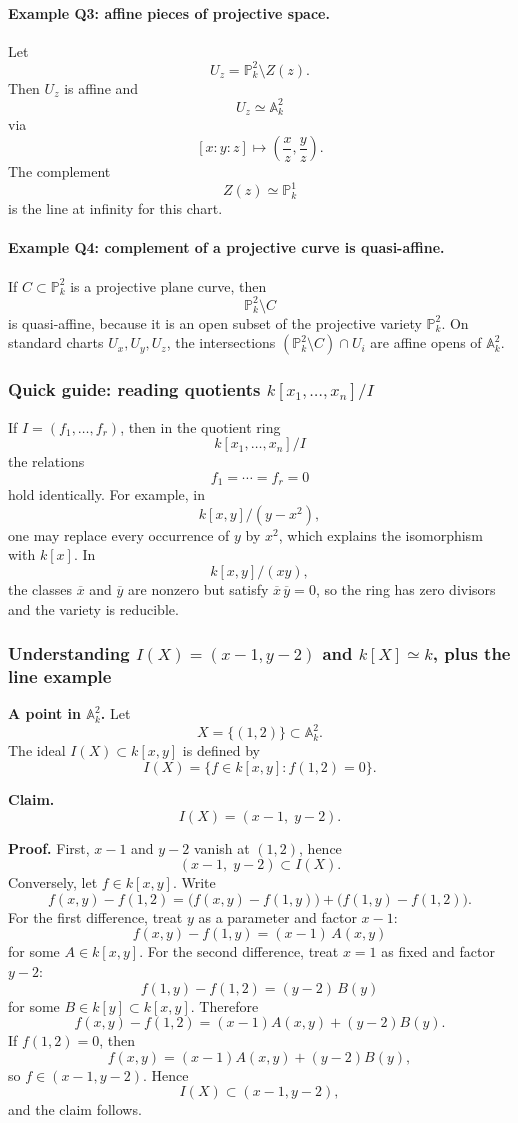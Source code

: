\documentclass[12pt,a4paper]{article}
\theoremstyle{plain}
\theoremstyle{definition}      %
\begin{document}
\paragraph{Example Q3: affine pieces of projective space.}
Let
\[
U_z=\mathbb P^2_k\setminus Z(z).
\]
Then \(U_z\) is affine and
\[
U_z\simeq \mathbb A^2_k
\]
via
\[
[x:y:z]\mapsto \left(\frac{x}{z},\frac{y}{z}\right).
\]
The complement
\[
Z(z)\simeq \mathbb P^1_k
\]
is the line at infinity for this chart.

\paragraph{Example Q4: complement of a projective curve is quasi-affine.}
If \(C\subset \mathbb P^2_k\) is a projective plane curve, then
\[
\mathbb P^2_k\setminus C
\]
is quasi-affine, because it is an open subset of the projective variety \(\mathbb P^2_k\).
On standard charts \(U_x,U_y,U_z\), the intersections \((\mathbb P^2_k\setminus C)\cap U_i\) are affine opens of \(\mathbb A^2_k\).

\subsubsection*{Quick guide: reading quotients \(k[x_1,\dots,x_n]/I\)}

If \(I=(f_1,\dots,f_r)\), then in the quotient ring
\[
k[x_1,\dots,x_n]/I
\]
the relations
\[
f_1=\cdots=f_r=0
\]
hold identically.
For example, in
\[
k[x,y]/(y-x^2),
\]
one may replace every occurrence of \(y\) by \(x^2\), which explains the isomorphism with \(k[x]\).
In
\[
k[x,y]/(xy),
\]
the classes \(\overline{x}\) and \(\overline{y}\) are nonzero but satisfy \(\overline{x}\,\overline{y}=0\), so the ring has zero divisors and the variety is reducible.

\subsubsection*{Understanding \(I(X)=(x-1,y-2)\) and \(k[X]\simeq k\), plus the line example}

\textbf{A point in \(\mathbb A^2_k\).}
Let
\[
X=\{(1,2)\}\subset \mathbb A^2_k.
\]
The ideal \(I(X)\subset k[x,y]\) is defined by
\[
I(X)=\{f\in k[x,y] : f(1,2)=0\}.
\]

\textbf{Claim.}
\[
I(X)=(x-1,\;y-2).
\]

\textbf{Proof.}
First, \(x-1\) and \(y-2\) vanish at \((1,2)\), hence
\[
(x-1,\;y-2)\subset I(X).
\]
Conversely, let \(f\in k[x,y]\). Write
\[
f(x,y)-f(1,2)
=
\bigl(f(x,y)-f(1,y)\bigr)
+
\bigl(f(1,y)-f(1,2)\bigr).
\]
For the first difference, treat \(y\) as a parameter and factor \(x-1\):
\[
f(x,y)-f(1,y)=(x-1)\,A(x,y)
\]
for some \(A\in k[x,y]\).
For the second difference, treat \(x=1\) as fixed and factor \(y-2\):
\[
f(1,y)-f(1,2)=(y-2)\,B(y)
\]
for some \(B\in k[y]\subset k[x,y]\).
Therefore
\[
f(x,y)-f(1,2)=(x-1)A(x,y)+(y-2)B(y).
\]
If \(f(1,2)=0\), then
\[
f(x,y)=(x-1)A(x,y)+(y-2)B(y),
\]
so \(f\in (x-1,y-2)\). Hence
\[
I(X)\subset (x-1,y-2),
\]
and the claim follows.
\end{document}
